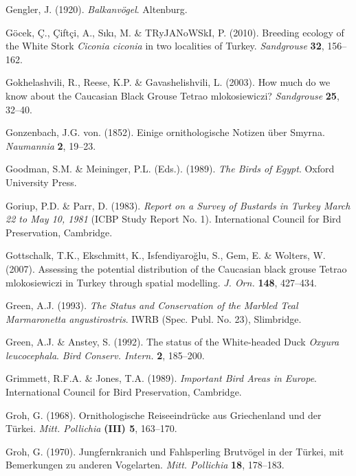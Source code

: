 \documentclass[
  a4paper,
  DIV=11,
  numbers=noendperiod]{scrreprt}
\newlength{\cslhangindent}
\newenvironment{CSLReferences}[2] %
 {\begin{list}{}{%
  \setlength{\itemindent}{0pt}
  \setlength{\leftmargin}{0pt}
  \setlength{\parsep}{0pt}
  \ifodd #1
   \setlength{\leftmargin}{\cslhangindent}
   \setlength{\itemindent}{-1\cslhangindent}
  \fi
  \setlength{\itemsep}{#2\baselineskip}}}
 {\end{list}}
\begin{document}
\begin{CSLReferences}{1}{1}
Gengler, J. (1920). \emph{{Balkanvögel}}. Altenburg.

Göcek, Ç., Çiftçi, A., Sıkı, M. \& TRyJANoWSkI, P. (2010). {Breeding
ecology of the White Stork \emph{Ciconia ciconia} in two localities of
Turkey}. \emph{Sandgrouse} \textbf{32}, 156--162.

Gokhelashvili, R., Reese, K.P. \& Gavashelishvili, L. (2003). {How much
do we know about the Caucasian Black Grouse Tetrao mlokosiewiczi?}
\emph{Sandgrouse} \textbf{25}, 32--40.

Gonzenbach, J.G. von. (1852). {Einige ornithologische Notizen über
Smyrna}. \emph{Naumannia} \textbf{2}, 19--23.

Goodman, S.M. \& Meininger, P.L. (Eds.). (1989). \emph{{The Birds of
Egypt}}. Oxford University Press.

Goriup, P.D. \& Parr, D. (1983). \emph{{Report on a Survey of Bustards
in Turkey March 22 to May 10, 1981}} (ICBP Study Report No. 1).
International Council for Bird Preservation, Cambridge.

Gottschalk, T.K., Ekschmitt, K., Isfendiyaroğlu, S., Gem, E. \& Wolters,
W. (2007). {Assessing the potential distribution of the Caucasian black
grouse Tetrao mlokosiewiczi in Turkey through spatial modelling}.
\emph{J. Orn.} \textbf{148}, 427--434.

Green, A.J. (1993). \emph{{The Status and Conservation of the Marbled
Teal Marmaronetta angustirostris}}. IWRB (Spec. Publ. No. 23),
Slimbridge.

Green, A.J. \& Anstey, S. (1992). {The status of the White-headed Duck
\emph{Oxyura leucocephala}}. \emph{Bird Conserv. Intern.} \textbf{2},
185--200.

Grimmett, R.F.A. \& Jones, T.A. (1989). \emph{{Important Bird Areas in
Europe}}. International Council for Bird Preservation, Cambridge.

Groh, G. (1968). {Ornithologische Reiseeindrücke aus Griechenland und
der Türkei}. \emph{Mitt. Pollichia} \textbf{(III) 5}, 163--170.

Groh, G. (1970). {Jungfernkranich und Fahlsperling Brutvögel in der
Türkei, mit Bemerkungen zu anderen Vogelarten}. \emph{Mitt. Pollichia}
\textbf{18}, 178--183.


\end{CSLReferences}
\end{document}
